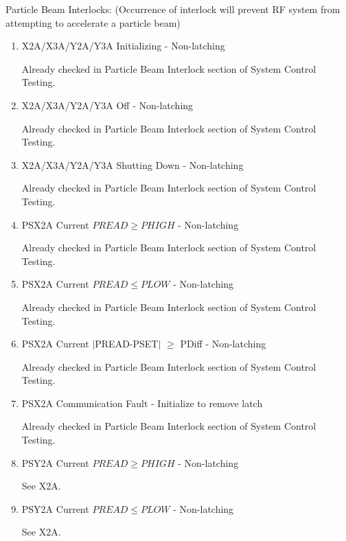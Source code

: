 \documentclass[11pt]{book}		%
\begin{document}
Particle Beam Interlocks:
(Occurrence of interlock will prevent RF system from attempting to accelerate a particle beam)

\begin{enumerate}
 \item X2A/X3A/Y2A/Y3A Initializing - Non-latching

\color{red}
Already checked in Particle Beam Interlock section of System Control Testing.
\color{black}

 \item X2A/X3A/Y2A/Y3A Off - Non-latching

\color{red}
Already checked in Particle Beam Interlock section of System Control Testing.
\color{black}

 \item X2A/X3A/Y2A/Y3A Shutting Down - Non-latching

\color{red}
Already checked in Particle Beam Interlock section of System Control Testing.
\color{black}

 \item PSX2A Current $PREAD \geq PHIGH$ - Non-latching

\color{red}
Already checked in Particle Beam Interlock section of System Control Testing.
\color{black}

 \item PSX2A Current $PREAD \leq PLOW$ - Non-latching

\color{red}
Already checked in Particle Beam Interlock section of System Control Testing.
\color{black}

 \item PSX2A Current $\mid$PREAD-PSET$\mid$  $\geq$ PDiff - Non-latching

\color{red}
Already checked in Particle Beam Interlock section of System Control Testing.
\color{black}

 \item PSX2A Communication Fault - Initialize to remove latch

\color{red}
Already checked in Particle Beam Interlock section of System Control Testing.
\color{black}

 \item PSY2A Current $PREAD \geq PHIGH$ - Non-latching

\color{red}
See X2A.
\color{black}

 \item PSY2A Current $PREAD \leq PLOW$ - Non-latching

\color{red}
See X2A.
\color{black}


\end{enumerate}
\end{document}

